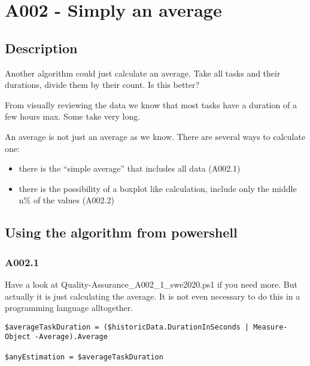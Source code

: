 \newpage{}
\newpage{}

\hypertarget{a002---simply-an-average}{%
\section{A002 - Simply an average}\label{a002---simply-an-average}}

\hypertarget{description}{%
\subsection{Description}}

Another algorithm could just calculate an average. Take all tasks and
their durations, divide them by their count. Is this better?

From visually reviewing the data we know that most tasks have a duration
of a few hours max. Some take very long.

An average is not just an average as we know. There are several ways to
calculate one:

\begin{itemize}
\tightlist
\item
  there is the ``simple average'' that includes all data (A002.1)
\item
  there is the possibility of a boxplot like calculation, include only
  the middle n\% of the values (A002.2)
\end{itemize}

\hypertarget{using-the-algorithm-from-powershell}{%
\subsection{Using the algorithm from powershell}}

\hypertarget{a002.1}{%
\subsubsection{A002.1}}

Have a look at Quality-Assurance\_A002\_1\_swe2020.ps1 if you need more.
But actually it is just calculating the average. It is not even
necessary to do this in a programming language alltogether.

\begin{verbatim}
$averageTaskDuration = ($historicData.DurationInSeconds | Measure-Object -Average).Average

$anyEstimation = $averageTaskDuration
\end{verbatim}

